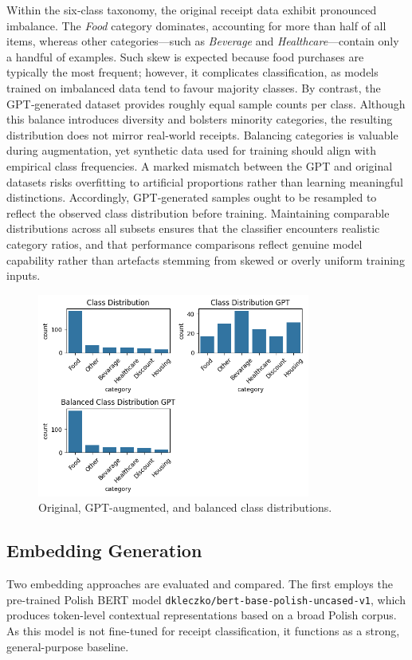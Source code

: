 \documentclass{SGGW-thesis-EN}
\begin{document}
Within the six‐class taxonomy, the original receipt data exhibit pronounced imbalance. The \emph{Food} category
dominates, accounting for more than half of all items, whereas other categories—such as \emph{Beverage}
and \emph{Healthcare}—contain only a handful of examples.  Such skew is expected because food purchases are typically the
most frequent; however, it complicates classification, as models trained on imbalanced data tend to favour majority
classes.  By contrast, the GPT‐generated dataset provides roughly equal sample counts per class.  Although this balance
introduces diversity and bolsters minority categories, the resulting distribution does not mirror real‐world receipts.
Balancing categories is valuable during augmentation, yet synthetic data used for training should align with empirical
class frequencies.  A marked mismatch between the GPT and original datasets risks overfitting to artificial proportions
rather than learning meaningful distinctions.  Accordingly, GPT‐generated samples ought to be resampled to reflect the
observed class distribution before training.
Maintaining comparable distributions across all subsets ensures that the classifier encounters realistic category
ratios, and that performance comparisons reflect genuine model capability rather than artefacts stemming from skewed or
overly uniform training inputs.

\begin{figure}[h]
  \centering
  \includegraphics[width=0.8\textwidth]{images/class_distribution.png}
  \caption{Original, GPT-augmented, and balanced class distributions.}
  \label{fig:dist_6class}
\end{figure}

\subsection{Embedding Generation}
Two embedding approaches are evaluated and compared.  The first employs the pre-trained Polish BERT model
\texttt{dkleczko/bert-base-polish-uncased-v1}, which produces token-level contextual representations based on a broad
Polish corpus.  As this model is not fine-tuned for receipt classification, it functions as a strong, general-purpose
baseline.
\end{document}
